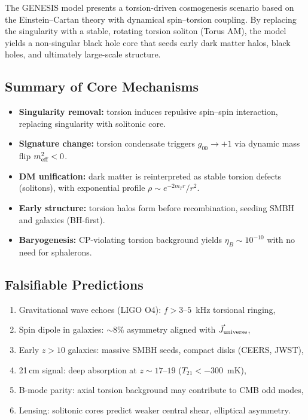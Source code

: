 \documentclass{article}
\begin{document}
The GENESIS model presents a torsion-driven cosmogenesis scenario based on the Einstein–Cartan theory with dynamical spin–torsion coupling. By replacing the singularity with a stable, rotating torsion soliton (Torus AM), the model yields a non-singular black hole core that seeds early dark matter halos, black holes, and ultimately large-scale structure.

\subsection{ Summary of Core Mechanisms}
\begin{itemize}
  \item \textbf{Singularity removal:} torsion induces repulsive spin–spin interaction, replacing singularity with solitonic core.
  \item \textbf{Signature change:} torsion condensate triggers $g_{00} \to +1$ via dynamic mass flip $m^2_{\rm eff} < 0$.
  \item \textbf{DM unification:} dark matter is reinterpreted as stable torsion defects (solitons), with exponential profile $\rho \sim e^{-2m_T r}/r^2$.
  \item \textbf{Early structure:} torsion halos form before recombination, seeding SMBH and galaxies (BH-first).
  \item \textbf{Baryogenesis:} CP-violating torsion background yields $\eta_B \sim 10^{-10}$ with no need for sphalerons.
\end{itemize}





\subsection{ Falsifiable Predictions}
\begin{enumerate}
  \item Gravitational wave echoes (LIGO O4): $f > 3$--$5$~kHz torsional ringing,
  \item Spin dipole in galaxies: $\sim 8\%$ asymmetry aligned with $\vec{J}_{\rm universe}$,
  \item Early $z>10$ galaxies: massive SMBH seeds, compact disks (CEERS, JWST),
  \item 21\,cm signal: deep absorption at $z \sim 17$--$19$ ($T_{21} < -300$~mK),
  \item B-mode parity: axial torsion background may contribute to CMB odd modes,
  \item Lensing: solitonic cores predict weaker central shear, elliptical asymmetry.
\end{enumerate}
\end{document}
